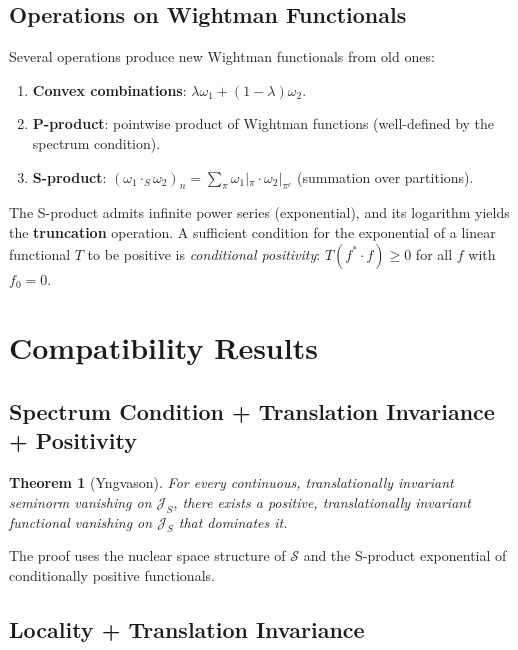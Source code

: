 \documentclass[11pt,a4paper]{article}
\newtheorem{theorem}{Theorem}[section]
\begin{document}
\subsection{Operations on Wightman Functionals}

Several operations produce new Wightman functionals from old ones:
\begin{enumerate}[nosep]
  \item \textbf{Convex combinations}: $\lambda\omega_1 + (1-\lambda)\omega_2$.
  \item \textbf{P-product}: pointwise product of Wightman functions
        (well-defined by the spectrum condition).
  \item \textbf{S-product}: $(\omega_1 \cdot_S \omega_2)_n = \sum_{\pi}
        \omega_1|_\pi \cdot \omega_2|_{\pi^c}$ (summation over partitions).
\end{enumerate}

The S-product admits infinite power series (exponential), and its
logarithm yields the \textbf{truncation} operation. A sufficient
condition for the exponential of a linear functional $T$ to be positive
is \emph{conditional positivity}: $T(f^* \cdot f) \geq 0$ for all
$f$ with $f_0 = 0$.

\section{Compatibility Results}

\subsection{Spectrum Condition + Translation Invariance + Positivity}

\begin{theorem}[Yngvason]
For every continuous, translationally invariant seminorm vanishing on
$\mathcal{J}_S$, there exists a positive, translationally invariant
functional vanishing on $\mathcal{J}_S$ that dominates it.
\end{theorem}

The proof uses the nuclear space structure of $\mathcal{S}$ and the
S-product exponential of conditionally positive functionals.

\subsection{Locality + Translation Invariance}
\end{document}
